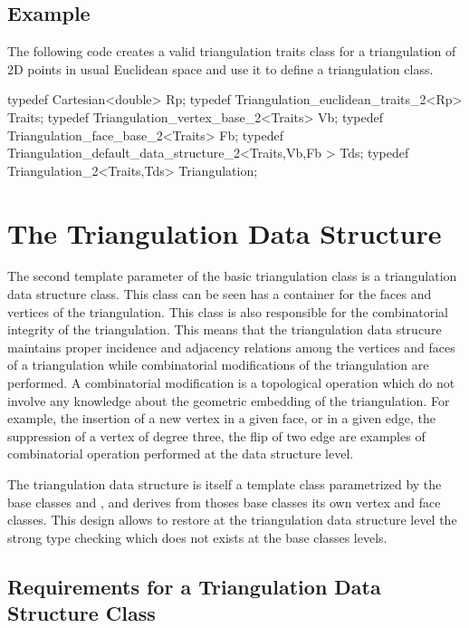 \subsection{Example}
The following code creates a  valid triangulation traits class 
for a triangulation of 2D points in usual Euclidean space
and use it to define a triangulation class.

\begin{cprog}
typedef Cartesian<double> Rp;
typedef Triangulation_euclidean_traits_2<Rp> Traits;
typedef Triangulation_vertex_base_2<Traits> Vb;
typedef Triangulation_face_base_2<Traits> Fb;
typedef Triangulation_default_data_structure_2<Traits,Vb,Fb > Tds;
typedef Triangulation_2<Traits,Tds> Triangulation;
\end{cprog}



\section{The Triangulation Data Structure}
\label{I1_Sect_Tds}

The second template parameter of the basic triangulation class
 is a triangulation data structure class.
This class can be seen has a container for the 
faces and vertices of the triangulation.
This class is also responsible for the combinatorial
integrity of the triangulation. This means that
the triangulation data strucure 
maintains  proper incidence and adjacency relations among the vertices
and faces of a triangulation while
combinatorial modifications
of the triangulation are performed. A combinatorial modification 
is a  topological operation which do not 
involve any knowledge about the geometric embedding of the triangulation.
For example, the  
insertion of a new vertex in a given face, or in a given edge,
the suppression
of a vertex of degree three,  the flip of two edge are 
examples of combinatorial operation performed at the data structure level.



The triangulation data structure is itself a template class
parametrized by the base classes  and ,
and derives from thoses base classes its own 
vertex and face classes. This design  allows to restore at the 
triangulation data structure
level 
the strong type checking which does not exists at the base classes levels.


\subsection{Requirements for a Triangulation Data Structure Class}

